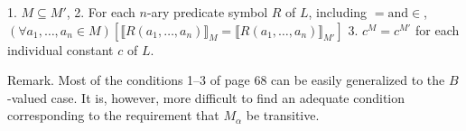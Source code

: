 1. $M \subseteq M'$,
2. For each $n$-ary predicate symbol $R$ of $L$, including $= \text{and} \in$,
   $(\forall a_1, \ldots, a_n \in M) [\llbracket R(a_1, \ldots, a_n) \rrbracket_M = \llbracket R(a_1, \ldots, a_n) \rrbracket_{M'}]$
3. $c^M = c^{M'}$ for each individual constant $c$ of $L$.

Remark. Most of the conditions 1–3 of page 68 can be easily generalized to the $B$-valued case. It is, however, more difficult to find an adequate condition corresponding to the requirement that $M_\alpha$ be transitive.
